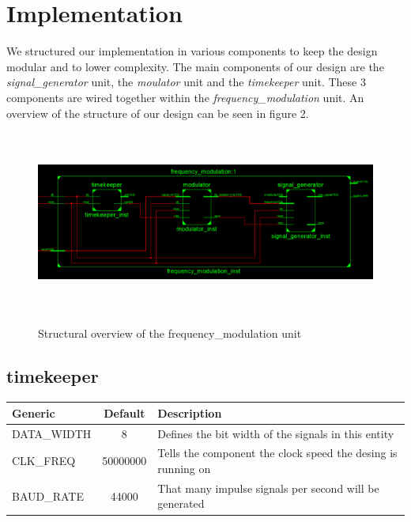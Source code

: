 \section{Implementation}

We structured our implementation in various components to keep the design modular and to lower complexity.
The main components of our design are the \textit{signal\_generator} unit, the \textit{moulator} unit and the
\textit{timekeeper} unit. These 3 components are wired together within the \textit{frequency\_modulation} unit.
An overview of the structure of our design can be seen in figure 2.

\begin{landscape}
	\begin{figure}[H] 
	    \scalebox{1.2} %
		{\includegraphics[height=6cm]{images/structure.png}} %
		\caption{Structural overview of the frequency\_modulation unit} 
		\label{fig:lorem} %
	\end{figure} 
\end{landscape}

\subsection{timekeeper}

\begin{center}
	\begin{tabular}{ | l | c | l | }
		\hline
		\textbf{Generic} & \textbf{Default} & \textbf{Description} \\
		\hline
		DATA\_WIDTH & 8 & Defines the bit width of the signals in this entity \\
		CLK\_FREQ & 50000000 & Tells the component the clock speed the desing is running on \\
		BAUD\_RATE & 44000 & That many impulse signals per second will be generated \\
		\hline
	\end{tabular} 
\end{center}

